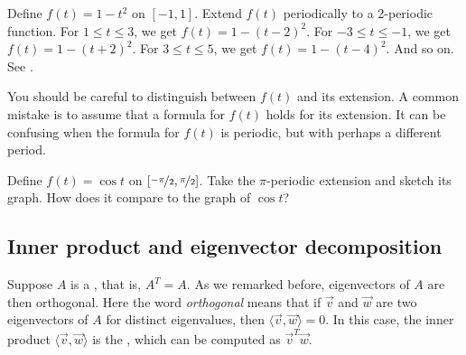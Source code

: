 \begin{example}
Define $f(t) = 1-t^2$ on $[-1,1]$.  Extend $f(t)$ periodically to
a 2-periodic function.
For $1 \leq t \leq 3$, we get
$f(t) = 1-{(t-2)}^2$.
For $-3 \leq t \leq -1$, we get
$f(t) = 1-{(t+2)}^2$.
For $3 \leq t \leq 5$, we get
$f(t) = 1-{(t-4)}^2$.  And so on.
See .
\begin{myfig}
\capstart
{}
\caption{Periodic extension of the function
$1-t^2$.\label{ts:perextofinvertedparabolafig}}
\end{myfig}
\end{example}

You should be careful to distinguish between $f(t)$ and its extension.  A common
mistake is to assume that a formula for $f(t)$ holds for its extension.  It
can be confusing when the formula for $f(t)$ is periodic, but with perhaps
a different period.

\begin{exercise}
Define $f(t) = \cos t$ on $[\nicefrac{-\pi}{2},\nicefrac{\pi}{2}]$.  Take the $\pi$-periodic
extension and sketch its graph.  How does it compare to the graph of
$\cos t$?
\end{exercise}

\subsection{Inner product and eigenvector decomposition}

Suppose $A$ is a \emph{},
that is, $A^T = A$.  As we remarked before, 
eigenvectors of $A$ are then orthogonal.  Here the word
\emph{orthogonal} means
that if $\vec{v}$ and $\vec{w}$ are two 
eigenvectors of $A$ for distinct eigenvalues,
then $\langle \vec{v} , \vec{w} \rangle = 0$.
In this case, the inner product $\langle \vec{v} , \vec{w} \rangle$
is the \emph{},
which can be computed as $\vec{v}^T\vec{w}$.


